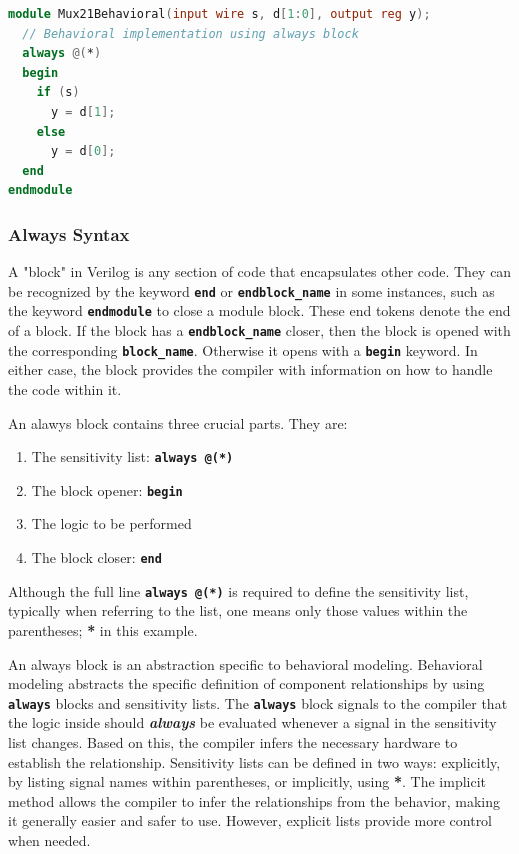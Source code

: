 \documentclass[12pt]{journal}
\begin{document}
\begin{lstlisting}[language=verilog]
module Mux21Behavioral(input wire s, d[1:0], output reg y);
  // Behavioral implementation using always block
  always @(*)
  begin
    if (s)
      y = d[1];
    else
      y = d[0];
  end
endmodule
\end{lstlisting}

\subsubsection{Always Syntax}
A "block" in Verilog is any section of code that encapsulates other code. They can be recognized by the keyword \textbf{\texttt{end}} or \textbf{\texttt{end\textlangle block\_name\textrangle}} in some instances, such as the keyword \textbf{\texttt{endmodule}} to close a module block. These end tokens denote the end of a block. If the block has a \textbf{\texttt{end\textlangle block\_name\textrangle}} closer, then the block is opened with the corresponding \textbf{\texttt{block\_name}}. Otherwise it opens with a \textbf{\texttt{begin}} keyword. In either case, the block provides the compiler with information on how to handle the code within it.


An alawys block contains three crucial parts. They are:

\begin{enumerate}
    \item The sensitivity list: \textbf{\texttt{always @(*)}}
    \item The block opener: \textbf{\texttt{begin}}
    \item The logic to be performed 
    \item The block closer: \textbf{\texttt{end}}
\end{enumerate}

Although the full line \textbf{\texttt{always @(*)}} is required to define the sensitivity list, typically when referring to the list, one means only those values within the parentheses; \textbf{*} in this example.

An always block is an abstraction specific to behavioral modeling. Behavioral modeling abstracts the specific definition of component relationships by using \textbf{\texttt{always}} blocks and sensitivity lists. The \textbf{\texttt{always}} block signals to the compiler that the logic inside should \textbf{\textit{always}} be evaluated whenever a signal in the sensitivity list changes. Based on this, the compiler infers the necessary hardware to establish the relationship. Sensitivity lists can be defined in two ways: explicitly, by listing signal names within parentheses, or implicitly, using \textbf{*}. The implicit method allows the compiler to infer the relationships from the behavior, making it generally easier and safer to use. However, explicit lists provide more control when needed.
\end{document}
